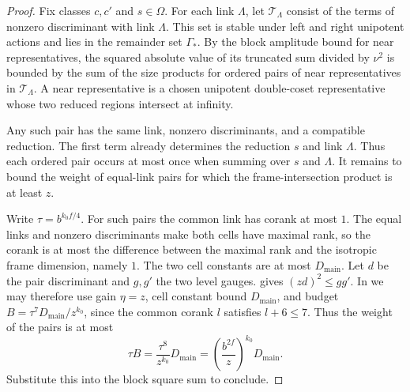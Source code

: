 \begin{proof}
Fix classes $c,c'$ and $s\in\Omega$. For each link $\Lambda$,
let $\mathcal T_\Lambda$ consist of the terms of nonzero discriminant with link $\Lambda$.
This set is stable under left and right unipotent actions and lies in the remainder set $\Gamma_*$.
By the block amplitude bound for near representatives, the squared absolute value of its truncated sum divided by $\nu^2$
is bounded by the sum of the size products for ordered pairs of near representatives in $\mathcal T_\Lambda$.
A near representative is a chosen unipotent double-coset representative whose two reduced regions intersect at infinity.

Any such pair has the same link, nonzero discriminants, and a compatible reduction.
The first term already determines the reduction $s$ and link $\Lambda$.
Thus each ordered pair occurs at most once when summing over $s$ and $\Lambda$.
It remains to bound the weight of equal-link pairs for which the frame-intersection product is at least $z$.

Write $\tau=b^{k_0 f/4}$. For such pairs the common link has corank at most $1$.
The equal links and nonzero discriminants make both cells have maximal rank,
so the corank is at most the difference between the maximal rank and the isotropic frame dimension, namely $1$.
The two cell constants are at most $D_{\mathrm{main}}$.
Let $d$ be the pair discriminant and $g,g'$ the two level gauges.
 gives $(zd)^2\le gg'$.
In  we may therefore use gain $\eta=z$,
cell constant bound $D_{\mathrm{main}}$, and budget
$B=\tau^7D_{\mathrm{main}}/z^{k_0}$, since the common corank $l$ satisfies $l+6\le7$.
Thus the weight of the pairs is at most
\[
 \tau B=\frac{\tau^8}{z^{k_0}}D_{\mathrm{main}}
       =\left(\frac{b^{2f}}{z}\right)^{k_0}D_{\mathrm{main}}.
\]
Substitute this into the block square sum to conclude.
\end{proof}

